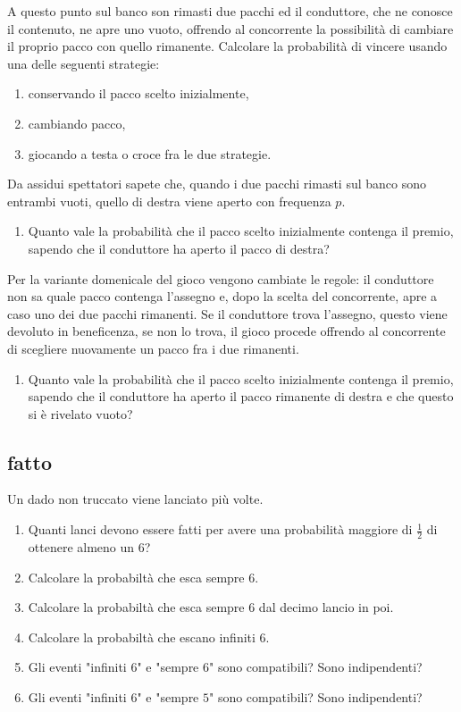 A questo punto sul banco son rimasti due pacchi ed il conduttore, che ne conosce il contenuto, ne apre uno vuoto, offrendo al concorrente la possibilità di cambiare il proprio pacco con quello rimanente. Calcolare la probabilità di vincere usando una delle seguenti strategie:
\begin{enumerate}
\item conservando il pacco scelto inizialmente,
\item cambiando pacco,
\item giocando a testa o croce fra le due strategie.
\end{enumerate}

Da assidui spettatori sapete che, quando i due pacchi rimasti sul banco sono entrambi vuoti, quello di destra viene aperto con frequenza $p$.
\begin{enumerate}
\item Quanto vale la probabilità che il pacco scelto inizialmente contenga il premio, sapendo che il conduttore ha aperto il pacco di destra?
\end{enumerate}

Per la variante domenicale del gioco vengono cambiate le regole: il conduttore non sa quale pacco contenga l'assegno e, dopo la scelta del concorrente, apre a caso uno dei due pacchi rimanenti. Se il conduttore trova l'assegno, questo viene devoluto in beneficenza, se non lo trova, il gioco procede offrendo al concorrente di scegliere nuovamente un pacco fra i due rimanenti.
\begin{enumerate}
\item Quanto vale la probabilità che il pacco scelto inizialmente contenga il premio, sapendo che il conduttore ha aperto il pacco rimanente di destra e che questo si è rivelato vuoto?
\end{enumerate}
\subsection{fatto}

Un dado non truccato viene lanciato più volte.
\begin{enumerate}
\item Quanti lanci devono essere fatti per avere una probabilità maggiore di $\frac{1}{2}$ di ottenere almeno un $6$?
\item Calcolare la probabiltà che esca sempre $6$.
\item Calcolare la probabiltà che esca sempre $6$ dal decimo lancio in poi.
\item Calcolare la probabiltà che escano infiniti $6$.
\item Gli eventi "infiniti $6$" e "sempre $6$" sono compatibili? Sono indipendenti?
\item Gli eventi "infiniti $6$" e "sempre $5$" sono compatibili? Sono indipendenti?
\end{enumerate}
